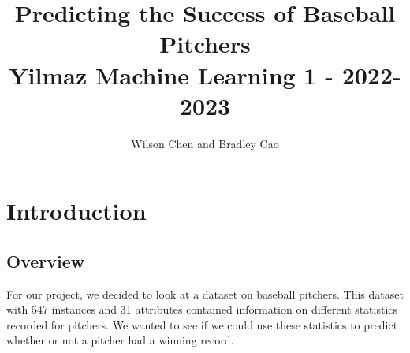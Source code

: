 \documentclass[12pt]{article}
\title{Predicting the Success of Baseball Pitchers \\ 
        \large Yilmaz Machine Learning 1 - 2022-2023}
\author{Wilson Chen and Bradley Cao}
\date{}
\begin{document}
\maketitle
\newpage{}
\section{Introduction}
\subsection{Overview}
For our project, we decided to look at a dataset on baseball pitchers. This dataset with 547 instances and 31 attributes contained information on different statistics recorded for pitchers. We wanted to see if we could use these statistics to predict whether or not a pitcher had a winning record. 
\end{document}
